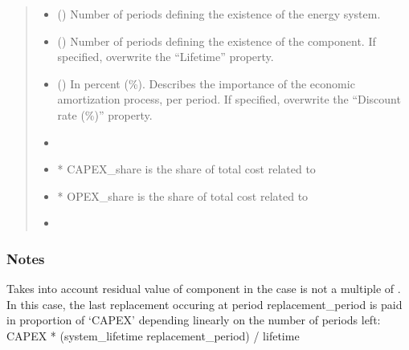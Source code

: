 \documentclass[letterpaper,10pt,english]{sphinxmanual}
\begin{document}
\begin{fulllineitems}
\begin{fulllineitems}
\begin{quote}
\begin{description}
\begin{itemize}
\item {} 
\sphinxAtStartPar
{} () \textendash{} Number of periods defining the existence of the energy system.

\item {} 
\sphinxAtStartPar
{} (\sphinxstyleliteralemphasis{\sphinxupquote{, }}) \textendash{} Number of periods defining the existence of the component.
If specified, overwrite the “Lifetime” property.

\item {} 
\sphinxAtStartPar
{} () \textendash{} In percent (\%). Describes the importance of the economic amortization process, per period.
If specified, overwrite the “Discount rate (\%)” property.

\end{itemize}

\sphinxAtStartPar
\begin{itemize}
\item {} 
\sphinxAtStartPar
{}

\item {} 
\sphinxAtStartPar
* CAPEX\_share is the share of total cost related to 

\item {} 
\sphinxAtStartPar
* OPEX\_share is the share of total cost related to 

\item {} 
\sphinxAtStartPar
{}

\end{itemize}


\end{description}\end{quote}
\subsubsection*{Notes}

\sphinxAtStartPar
Takes into account residual value of component in the case  is not a multiple of .
In this case, the last replacement occuring at period replacement\_period is paid in proportion of ‘CAPEX’
depending linearly on the number of periods left:
CAPEX * (system\_lifetime \sphinxhyphen{} replacement\_period) / lifetime


\end{fulllineitems}
\end{fulllineitems}
\end{document}

